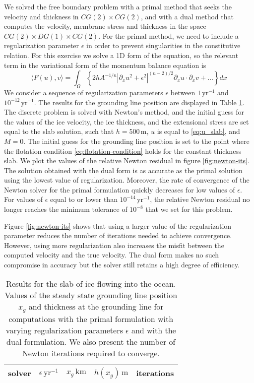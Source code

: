 \documentclass[review,oneside]{igs}
\begin{document}
We solved the free boundary problem with a primal method that seeks the velocity and thickness in $CG(2)\times CG(2)$, and with a dual method that computes the velocity, membrane stress and thickness in the space $CG(2)\times DG(1)\times CG(2)$.
For the primal method, we need to include a regularization parameter $\epsilon$ in order to prevent singularities in the constitutive relation.
For this exercise we solve a 1D form of the equation, so the relevant term in the variational form of the momentum balance equation is
\begin{equation}
    \langle F(u), v\rangle = \int_\Omega \left\{2hA^{-1/n}|\partial_xu^2 + \epsilon^2|^{(n - 2)/2}\partial_xu\cdot\partial_xv + \ldots\right\}dx
\end{equation}
We consider a sequence of regularization parameters $\epsilon$ between $1\, \mathrm{yr}^{-1}$ and $10^{-12}\,\mathrm{yr}^{-1}$.
The results for the grounding line position are displayed in Table \ref{tab:slab}.
The discrete problem is solved with Newton's method, and the initial guess for the values of the ice velocity, the ice thickness, and the extensional stress are set equal to the slab solution, such that $h = 500\,\mathrm{m}$, $u$ is equal to \eqref{eq:u_slab}, and $M = 0$.
The initial guess for the grounding line position is set to the point where the flotation condition \eqref{eq:flotation-condition} holds for the constant thickness slab.
We plot the values of the relative Newton residual in figure \ref{fig:newton-its}.
The solution obtained with the dual form is as accurate as the primal solution using the lowest value of regularization.
Moreover, the rate of convergence of the Newton solver for the primal formulation quickly decreases for low values of $\epsilon$.
For values of $\epsilon$ equal to or lower than $10^{-14}\,\mathrm{yr}^{-1}$, the relative Newton residual no longer reaches the minimum tolerance of $10^{-8}$ that we set for this problem.

Figure \ref{fig:newton-its} shows that using a larger value of the regularization parameter reduces the number of iterations needed to achieve convergence.
However, using more regularization also increases the misfit between the computed velocity and the true velocity.
The dual form makes no such compromise in accuracy but the solver still retains a high degree of efficiency.

\begin{table}[h]
\centering
\caption{Results for the slab of ice flowing into the ocean. Values of the steady state grounding line position $x_g$ and thickness at the grounding line for computations with the primal formulation with varying regularization parameters $\epsilon$ and with the dual formulation. We also present the number of Newton iterations required to converge.}
\label{tab:slab}
\begin{tabular}{ccccc}
\toprule
solver & $\epsilon\,\mathrm{yr}^{-1}$ & $x_g\,\mathrm{km}$ & $h(x_g)\,\mathrm{m}$ & iterations \\
\midrule

\end{tabular}
\end{table}
\end{document}
